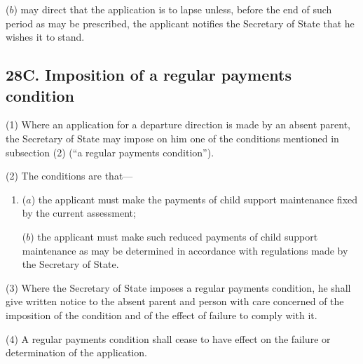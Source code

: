 \documentclass[a4paper]{article}
\begin{document}
{\begin{enumerate}
($b$) may direct that the application is to lapse unless, before the end of such period as may be prescribed, the applicant notifies the Secretary of State that he wishes it to stand.
\end{enumerate}


\subsection{28C. Imposition of a regular payments condition}

(1) Where an application for a departure direction is made by an absent parent, the Secretary of State may impose on him one of the conditions mentioned in subsection (2) (“a regular payments condition”).

(2) The conditions are that---
\begin{enumerate}\item[]
($a$) the applicant must make the payments of child support maintenance fixed by the current assessment;

($b$) the applicant must make such reduced payments of child support maintenance as may be determined in accordance with regulations made by the Secretary of State.
\end{enumerate}

(3)
Where the Secretary of State imposes a regular payments condition, he shall give written notice to the absent parent and person with care concerned of the imposition of the condition and of the effect of failure to comply with it.

(4)
A regular payments condition shall cease to have effect on the failure or determination of the application.

}
\end{document}
